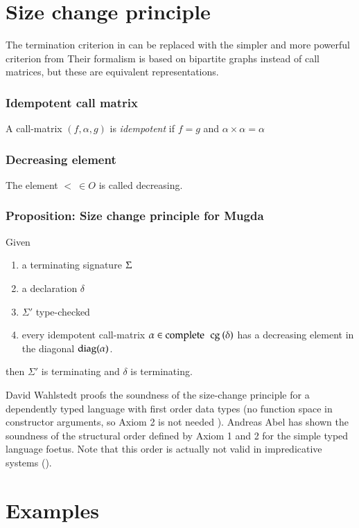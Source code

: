 \section{Size change principle}

The termination criterion in \cite{abelAltenkirch:predStRec} can be replaced with the
simpler and more powerful criterion from \cite{lee01sizechange}
Their formalism is based on bipartite graphs instead of call matrices, but these are
equivalent representations.


\subsubsection{Idempotent call matrix}
A call-matrix $(f,\alpha,g)$ is \emph{idempotent} if $ f = g $ and $ \alpha \times \alpha = \alpha $ 

\subsubsection{Decreasing element}
The element $< \: \in O$ is called decreasing.

\subsubsection{Proposition: Size change principle for Mugda}
Given
\begin{enumerate}
\item
a terminating signature $\Sigma$
\item
a declaration $\delta$
\item
$\Sigma'$ type-checked
\item
every idempotent call-matrix  $ \alpha \in \operatorname{complete}\: \: \operatorname{cg}\:(\delta)$ has a decreasing element in the diagonal $\operatorname{diag}(\alpha)$.
\end{enumerate}
then $\Sigma'$ is terminating and $\delta$ is terminating.

David Wahlstedt \cite{wahlstedt:phd:2007} proofs the soundness of the size-change principle for a dependently typed language 
with first order data types (no function space in constructor arguments, so Axiom 2 is not needed ).
Andreas Abel \cite{abelAltenkirch:predStRec} has shown the soundness of the structural order defined by Axiom 1 and 2 for the simple typed language foetus.
Note that this order is actually not valid in impredicative systems (\cite{abel:PhD}).

\section{Examples}

